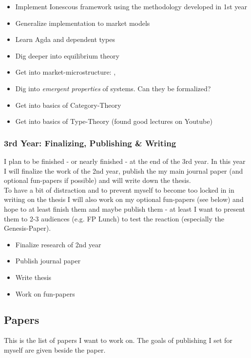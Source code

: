 \begin{itemize}
\item Implement Ionescous framework using the methodology developed in 1st year
\item Generalize implementation to market models
\item Learn Agda and dependent types
\item Dig deeper into equilibrium theory 
\item Get into market-microstructure: \cite{LehalleLaruelle2013}, \cite{baker_market_2013}
\item Dig into \textit{emergent properties} of systems. Can they be formalized?
\item Get into basics of Category-Theory \cite{Pierce1991} \cite{spivak_category_2014}
\item Get into basics of Type-Theory (found good lectures on Youtube)

\end{itemize}

\subsubsection{3rd Year: Finalizing, Publishing \& Writing}
I plan to be finished - or nearly finished - at the end of the 3rd year. In this year I will finalize the work of the 2nd year, publish the my main journal paper (and optional fun-papers if possible) and will write down the thesis. \\ To have a bit of distraction and to prevent myself to become too locked in in writing on the thesis I will also work on my optional fun-papers (see below) and hope to at least finish them and maybe publish them - at least I want to present them to 2-3 audiences (e.g. FP Lunch) to test the reaction (especially the Genesis-Paper).

\begin{itemize}
\item Finalize research of 2nd year
\item Publish journal paper
\item Write thesis
\item Work on fun-papers
\end{itemize}

\subsection{Papers}
This is the list of papers I want to work on. The goals of publishing I set for myself are given beside the paper.

